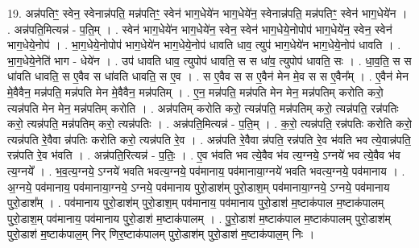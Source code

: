 \documentclass[17pt]{extarticle}
\begin{document}
19. अन्न॑पतिꣳ॒॒ स्वेन॒ स्वेनान्न॑पति॒ मन्न॑पतिꣳ॒॒ स्वेन॑ भाग॒धेये॑न भाग॒धेये॑न॒ स्वेनान्न॑पति॒ मन्न॑पतिꣳ॒॒ स्वेन॑ भाग॒धेये॑न । . अन्न॑पति॒मित्यन्न॑ - प॒ति॒म् । . स्वेन॑ भाग॒धेये॑न भाग॒धेये॑न॒ स्वेन॒ स्वेन॑ भाग॒धेये॒नोपोप॑ भाग॒धेये॑न॒ स्वेन॒ स्वेन॑ भाग॒धेये॒नोप॑ । . भा॒ग॒धेये॒नोपोप॑ भाग॒धेये॑न भाग॒धेये॒नोप॑ धावति धाव॒ त्युप॑ भाग॒धेये॑न भाग॒धेये॒नोप॑ धावति । . भा॒ग॒धेये॒नेति॑ भाग - धेये॑न । . उप॑ धावति धाव॒ त्युपोप॑ धावति॒ स स धा॑व॒ त्युपोप॑ धावति॒ सः । . धा॒व॒ति॒ स स धा॑वति धावति॒ स ए॒वैव स धा॑वति धावति॒ स ए॒व । . स ए॒वैव स स ए॒वैन॑ मेन मे॒व स स ए॒वैन᳚म् । . ए॒वैन॑ मेन मे॒वैवैन॒ मन्न॑पति॒ मन्न॑पति मेन मे॒वैवैन॒ मन्न॑पतिम् । . ए॒न॒ मन्न॑पति॒ मन्न॑पति मेन मेन॒ मन्न॑पतिम् करोति करो॒ त्यन्न॑पति मेन मेन॒ मन्न॑पतिम् करोति । . अन्न॑पतिम् करोति करो॒ त्यन्न॑पति॒ मन्न॑पतिम् करो॒ त्यन्न॑पति॒ रन्न॑पतिः करो॒ त्यन्न॑पति॒ मन्न॑पतिम् करो॒ त्यन्न॑पतिः । . अन्न॑पति॒मित्यन्न॑ - प॒ति॒म् । . क॒रो॒ त्यन्न॑पति॒ रन्न॑पतिः करोति करो॒ त्यन्न॑पति रे॒वैवा न्न॑पतिः करोति करो॒ त्यन्न॑पति रे॒व । . अन्न॑पति रे॒वैवा न्न॑पति॒ रन्न॑पति रे॒व भ॑वति भव त्ये॒वान्न॑पति॒ रन्न॑पति रे॒व भ॑वति । . अन्न॑पति॒रित्यन्न॑ - प॒तिः॒ । . ए॒व भ॑वति भव त्ये॒वैव भ॑व त्य॒ग्नये॒ ऽग्नये॑ भव त्ये॒वैव भ॑व त्य॒ग्नये᳚ । . भ॒व॒त्य॒ग्नये॒ ऽग्नये॑ भवति भवत्य॒ग्नये॒ पव॑मानाय॒ पव॑मानाया॒ग्नये॑ भवति भवत्य॒ग्नये॒ पव॑मानाय । . अ॒ग्नये॒ पव॑मानाय॒ पव॑मानाया॒ग्नये॒ ऽग्नये॒ पव॑मानाय पुरो॒डाश॑म् पुरो॒डाश॒म् पव॑मानाया॒ग्नये॒ ऽग्नये॒ पव॑मानाय पुरो॒डाश᳚म् । . पव॑मानाय पुरो॒डाश॑म् पुरो॒डाश॒म् पव॑मानाय॒ पव॑मानाय पुरो॒डाश॑ म॒ष्टाक॑पाल म॒ष्टाक॑पालम् पुरो॒डाश॒म् पव॑मानाय॒ पव॑मानाय पुरो॒डाश॑ म॒ष्टाक॑पालम् । . पु॒रो॒डाश॑ म॒ष्टाक॑पाल म॒ष्टाक॑पालम् पुरो॒डाश॑म् पुरो॒डाश॑ म॒ष्टाक॑पाल॒म् निर् णिर॒ष्टाक॑पालम् पुरो॒डाश॑म् पुरो॒डाश॑ म॒ष्टाक॑पाल॒म् निः । \newline
\end{document}
